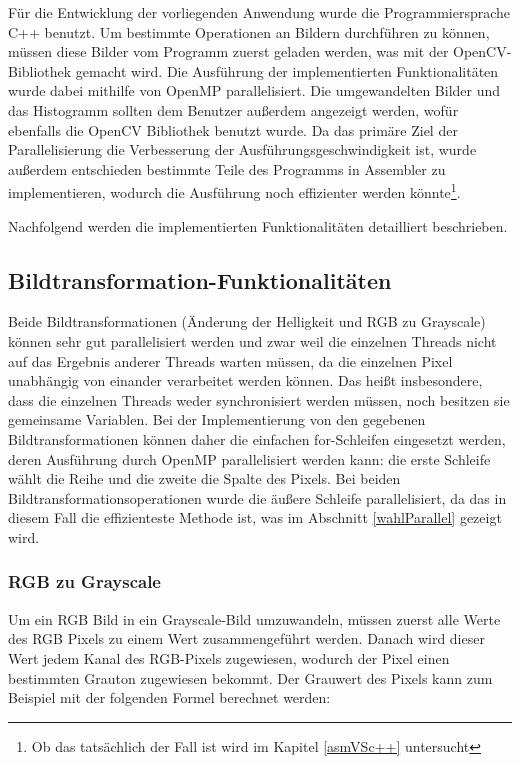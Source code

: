 \documentclass[11pt]{amsart}
\begin{document}
Für die Entwicklung der vorliegenden Anwendung wurde die Programmiersprache C++ benutzt. Um bestimmte Operationen an Bildern durchführen zu können, müssen diese Bilder vom Programm zuerst geladen werden, was mit der OpenCV-Bibliothek gemacht wird. Die Ausführung der implementierten Funktionalitäten wurde dabei mithilfe von OpenMP parallelisiert. Die umgewandelten Bilder und das Histogramm sollten dem Benutzer außerdem angezeigt werden, wofür ebenfalls die OpenCV Bibliothek benutzt wurde. Da das primäre Ziel der Parallelisierung die Verbesserung der Ausführungsgeschwindigkeit ist, wurde außerdem entschieden bestimmte Teile des Programms in Assembler zu implementieren, wodurch die Ausführung noch effizienter werden könnte\footnote{Ob das tatsächlich der Fall ist wird im Kapitel \ref{asmVSc++} untersucht}.

Nachfolgend werden die implementierten Funktionalitäten detailliert beschrieben.

\subsection{Bildtransformation-Funktionalitäten}\label{sec:picTransform}
Beide Bildtransformationen (Änderung der Helligkeit und RGB zu Grayscale) können sehr gut parallelisiert werden und zwar weil die einzelnen Threads nicht auf das Ergebnis anderer Threads warten müssen, da die einzelnen Pixel unabhängig von einander verarbeitet werden können. Das heißt insbesondere, dass die einzelnen Threads weder synchronisiert werden müssen, noch besitzen sie gemeinsame Variablen. Bei der Implementierung von den gegebenen Bildtransformationen können daher die einfachen for-Schleifen eingesetzt werden, deren Ausführung durch OpenMP parallelisiert werden kann: die erste Schleife wählt die Reihe und die zweite die Spalte des Pixels. Bei beiden Bildtransformationsoperationen wurde die äußere Schleife parallelisiert, da das in diesem Fall die effizienteste Methode ist, was im Abschnitt \ref{wahlParallel} gezeigt wird.

 
 

 
 
 
 
\subsubsection{RGB zu Grayscale}\label{sec:gray}
Um ein RGB Bild in ein Grayscale-Bild umzuwandeln, müssen zuerst alle Werte des RGB Pixels zu einem Wert zusammengeführt werden. Danach wird dieser Wert jedem Kanal des RGB-Pixels zugewiesen, wodurch der Pixel einen bestimmten Grauton zugewiesen bekommt. Der Grauwert des Pixels kann zum Beispiel mit der folgenden Formel berechnet werden: 
\end{document}
